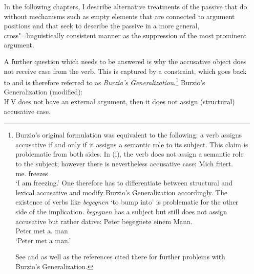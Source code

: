 In the following chapters, I describe alternative treatments of the passive that do without mechanisms such as
empty elements that are connected to argument positions and that seek to describe the passive in a more
general, cross"=linguistically consistent manner as the suppression of the most prominent argument.

A further question which needs to be answered is why the accusative object does not receive case from the verb.
This is captured by a constraint, which goes back to \citet[--185]{Burzio86a-u-gekauft} and is therefore
referred to as \emph{Burzio's Generalization}.\footnote{%
Burzio's original formulation was equivalent to the following: a verb assigns accusative if and only if it assigns
a semantic role to its subject.
This claim is problematic from both sides. In (i), the verb does not assign a semantic role to the subject; however
there is nevertheless accusative case:
\ea
\gll Mich friert.\\
	 me.\acc{} freezes\\
\glt `I am freezing.'
\z
One therefore has to differentiate between structural and lexical accusative and modify Burzio's Generalization
accordingly. The existence of verbs like \emph{begegnen} `to bump into' is problematic for the other side of
the implication. \emph{begegnen} has a subject but still does not assign accusative but rather
dative:
\ea
\gll Peter begegnete einem Mann.\\
     Peter met a.\dat{} man\\
\glt `Peter met a man.'
\z

\noindent
See  and  as well as the references cited there for further problems
with Burzio's Generalization.
}
\largerpage
\ea
Burzio's Generalization (modified):\\
If V does not have an external argument, then it does not assign (structural) accusative case.
\z

